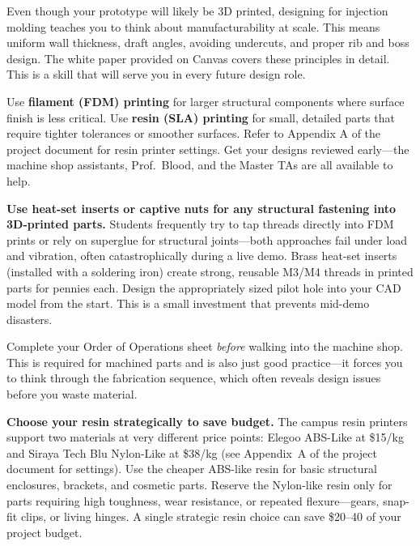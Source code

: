 \begin{faqbox}
Even though your prototype will likely be 3D printed, designing for injection molding teaches you to think about manufacturability at scale. This means uniform wall thickness, draft angles, avoiding undercuts, and proper rib and boss design. The white paper provided on Canvas covers these principles in detail. This is a skill that will serve you in every future design role.
\end{faqbox}

\begin{faqbox}
Use \textbf{filament (FDM) printing} for larger structural components where surface finish is less critical. Use \textbf{resin (SLA) printing} for small, detailed parts that require tighter tolerances or smoother surfaces. Refer to Appendix A of the project document for resin printer settings. Get your designs reviewed early---the machine shop assistants, Prof.\ Blood, and the Master TAs are all available to help.
\end{faqbox}

\begin{protip}
\textbf{Use heat-set inserts or captive nuts for any structural fastening into 3D-printed parts.} Students frequently try to tap threads directly into FDM prints or rely on superglue for structural joints---both approaches fail under load and vibration, often catastrophically during a live demo. Brass heat-set inserts (installed with a soldering iron) create strong, reusable M3/M4 threads in printed parts for pennies each. Design the appropriately sized pilot hole into your CAD model from the start. This is a small investment that prevents mid-demo disasters.
\end{protip}

\begin{tipbox}
Complete your Order of Operations sheet \textit{before} walking into the machine shop. This is required for machined parts and is also just good practice---it forces you to think through the fabrication sequence, which often reveals design issues before you waste material.
\end{tipbox}

\begin{protip}
\textbf{Choose your resin strategically to save budget.} The campus resin printers support two materials at very different price points: Elegoo ABS-Like at \$15/kg and Siraya Tech Blu Nylon-Like at \$38/kg (see Appendix~A of the project document for settings). Use the cheaper ABS-like resin for basic structural enclosures, brackets, and cosmetic parts. Reserve the Nylon-like resin only for parts requiring high toughness, wear resistance, or repeated flexure---gears, snap-fit clips, or living hinges. A single strategic resin choice can save \$20--40 of your project budget.
\end{protip}

